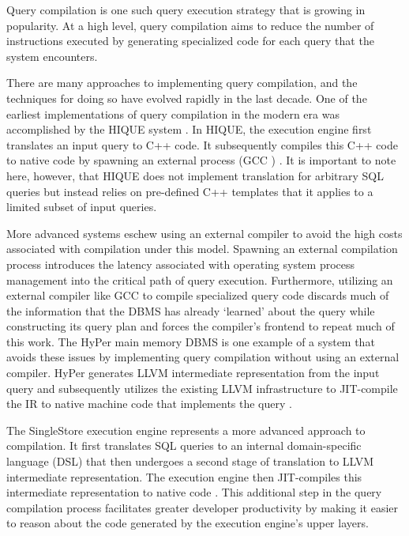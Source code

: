 \documentclass{vldb}
\begin{document}
Query compilation is one such query execution strategy that is growing in popularity. At a high level, query compilation aims to reduce the number of instructions executed by generating specialized code for each query that the system encounters. 

There are many approaches to implementing query compilation, and the techniques for doing so have evolved rapidly in the last decade. One of the earliest implementations of query compilation in the modern era was accomplished by the HIQUE system \cite{systemr}. In HIQUE, the execution engine first translates an input query to C++ code. It subsequently compiles this C++ code to native code by spawning an external process (GCC \cite{gcc}) \cite{krikellas10}. It is important to note here, however, that HIQUE does not implement translation for arbitrary SQL queries but instead relies on pre-defined C++ templates that it applies to a limited subset of input queries.

More advanced systems eschew using an external compiler to avoid the high costs associated with compilation under this model. Spawning an external compilation process introduces the latency associated with operating system process management into the critical path of query execution. Furthermore, utilizing an external compiler like GCC to compile specialized query code discards much of the information that the DBMS has already `learned' about the query while constructing its query plan and forces the compiler's frontend to repeat much of this work. The HyPer main memory DBMS \cite{hyper} is one example of a system that avoids these issues by implementing query compilation without using an external compiler. HyPer generates LLVM \cite{LLVM} intermediate representation from the input query and subsequently utilizes the existing LLVM infrastructure to JIT-compile the IR to native machine code that implements the query \cite{neumann11, kemper11}.

The SingleStore \cite{singlestore} execution engine represents a more advanced approach to compilation. It first translates SQL queries to an internal domain-specific language (DSL) that then undergoes a second stage of translation to LLVM intermediate representation. The execution engine then JIT-compiles this intermediate representation to native code \cite{paroski16}. This additional step in the query compilation process facilitates greater developer productivity by making it easier to reason about the code generated by the execution engine's upper layers.
\end{document}
